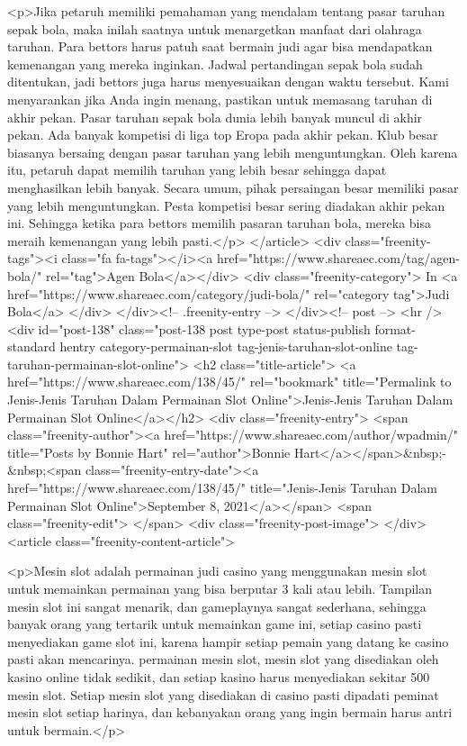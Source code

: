 <p>Jika petaruh memiliki pemahaman yang mendalam tentang pasar taruhan sepak bola, maka inilah saatnya untuk menargetkan manfaat dari olahraga taruhan. Para bettors harus patuh saat bermain judi agar bisa mendapatkan kemenangan yang mereka inginkan. Jadwal pertandingan sepak bola sudah ditentukan, jadi bettors juga harus menyesuaikan dengan waktu tersebut. Kami menyarankan jika Anda ingin menang, pastikan untuk memasang taruhan di akhir pekan. Pasar taruhan sepak bola dunia lebih banyak muncul di akhir pekan. Ada banyak kompetisi di liga top Eropa pada akhir pekan. Klub besar biasanya bersaing dengan pasar taruhan yang lebih menguntungkan. Oleh karena itu, petaruh dapat memilih taruhan yang lebih besar sehingga dapat menghasilkan lebih banyak. Secara umum, pihak persaingan besar memiliki pasar yang lebih menguntungkan. Pesta kompetisi besar sering diadakan akhir pekan ini. Sehingga ketika para bettors memilih pasaran taruhan bola, mereka bisa meraih kemenangan yang lebih pasti.</p>
									</article>
																			<div class="freenity-tags"><i class="fa fa-tags"></i><a href="https://www.shareaec.com/tag/agen-bola/" rel="tag">Agen Bola</a></div>
																			<div class="freenity-category">
											In <a href="https://www.shareaec.com/category/judi-bola/" rel="category tag">Judi Bola</a>										</div>
																	</div><!-- .freenity-entry -->
							</div><!-- post -->
							<hr />
													<div id="post-138" class="post-138 post type-post status-publish format-standard hentry category-permainan-slot tag-jenis-taruhan-slot-online tag-taruhan-permainan-slot-online">
								<h2 class="title-article">
									<a href="https://www.shareaec.com/138/45/" rel="bookmark" title="Permalink to Jenis-Jenis Taruhan Dalam Permainan Slot Online">Jenis-Jenis Taruhan Dalam Permainan Slot Online</a></h2>
								<div class="freenity-entry">
									<span class="freenity-author"><a href="https://www.shareaec.com/author/wpadmin/" title="Posts by Bonnie Hart" rel="author">Bonnie Hart</a></span>&nbsp;-&nbsp;<span class="freenity-entry-date"><a href="https://www.shareaec.com/138/45/" title="Jenis-Jenis Taruhan Dalam Permainan Slot Online">September 8, 2021</a></span>
									<span class="freenity-edit"> </span>
									<div class="freenity-post-image">  </div>
																		<article class="freenity-content-article">
										
<p>Mesin slot adalah permainan judi casino yang menggunakan mesin slot untuk memainkan permainan yang bisa berputar 3 kali atau lebih. Tampilan mesin slot ini sangat menarik, dan gameplaynya sangat sederhana, sehingga banyak orang yang tertarik untuk memainkan game ini, setiap casino pasti menyediakan game slot ini, karena hampir setiap pemain yang datang ke casino pasti akan mencarinya. permainan mesin slot, mesin slot yang disediakan oleh kasino online tidak sedikit, dan setiap kasino harus menyediakan sekitar 500 mesin slot. Setiap mesin slot yang disediakan di casino pasti dipadati peminat mesin slot setiap harinya, dan kebanyakan orang yang ingin bermain harus antri untuk bermain.</p>



